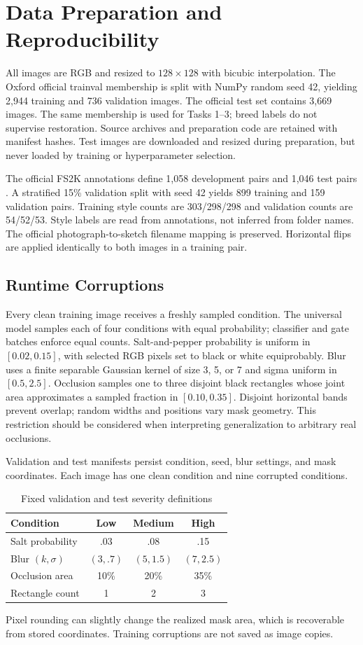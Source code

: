 \documentclass[conference]{IEEEtran}
\begin{document}
\section{Data Preparation and Reproducibility}
All images are RGB and resized to $128\times128$ with bicubic interpolation.
The Oxford official trainval membership \cite{pets} is split with NumPy random seed 42,
yielding 2,944 training and 736 validation images. The official test set contains
3,669 images. The same membership is used for Tasks 1--3; breed labels do not
supervise restoration. Source archives and preparation code are retained with
manifest hashes. Test images are downloaded and resized during preparation,
but never loaded by training or hyperparameter selection.

The official FS2K annotations define 1,058 development pairs and 1,046 test
pairs \cite{fs2k}. A stratified 15\% validation split with seed 42 yields 899
training and 159 validation pairs. Training style counts are 303/298/298 and
validation counts are 54/52/53. Style labels are read from annotations, not
inferred from folder names. The official photograph-to-sketch filename mapping
is preserved. Horizontal flips are applied identically to both images in a
training pair.

\subsection{Runtime Corruptions}
Every clean training image receives a freshly sampled condition. The universal
model samples each of four conditions with equal probability; classifier and
gate batches enforce equal counts. Salt-and-pepper probability is uniform in
$[0.02,0.15]$, with selected RGB pixels set to black or white equiprobably. Blur
uses a finite separable Gaussian kernel of size 3, 5, or 7 and sigma uniform in
$[0.5,2.5]$. Occlusion samples one to three disjoint black rectangles whose
joint area approximates a sampled fraction in $[0.10,0.35]$. Disjoint horizontal
bands prevent overlap; random widths and positions vary mask geometry. This
restriction should be considered when interpreting generalization to arbitrary
real occlusions.

Validation and test manifests persist condition, seed, blur settings, and mask
coordinates. Each image has one clean condition and nine corrupted conditions.
\begin{table}[!ht]\centering\caption{Fixed validation and test severity definitions}
\begin{tabular}{lccc}\toprule Condition & Low & Medium & High\\\midrule
Salt probability & .03 & .08 & .15\\
Blur $(k,\sigma)$ & $(3,.7)$ & $(5,1.5)$ & $(7,2.5)$\\
Occlusion area & 10\% & 20\% & 35\%\\
Rectangle count & 1 & 2 & 3\\\bottomrule\end{tabular}\end{table}
Pixel rounding can slightly change the realized mask area, which is recoverable
from stored coordinates. Training corruptions are not saved as image copies.
\end{document}
